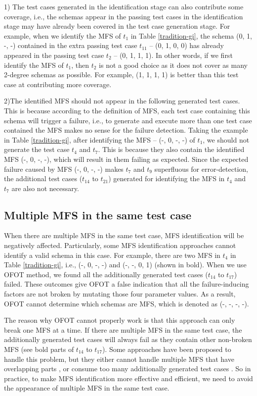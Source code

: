 \documentclass[journal,12pt,onecolumn,draftclsnofoot,]{IEEEtran}
\begin{document}
1) The test cases generated in the identification stage can also contribute some coverage, i.e., the schemas appear in the passing test cases in the identification stage may have already been covered in the test case generation stage. For example, when we identify the MFS of $t_{1}$ in Table \ref{tradition-gi}, the schema (0, 1, -, -) contained in the extra passing test case $t_{11}$ -- (0, 1, 0, 0) has already appeared in the passing test case $t_{2}$ -- (0, 1, 1, 1). In other words, if we first identify the MFS of $t_{1}$, then $t_{2}$ is not a good choice as it does not cover as many 2-degree schemas as possible. For example, (1, 1, 1, 1) is better than this test case at contributing more coverage.

2)The identified MFS should not appear in the following generated test cases.  This is because according to the definition of MFS, each test case containing this schema will trigger a failure, i.e., to generate and execute more than one test case contained the MFS makes no sense for the failure detection. Taking the example in Table \ref{tradition-gi}, after identifying the MFS -- (-, 0, -, -) of $t_{1}$, we should not generate the test case $t_{4}$ and $t_{7}$. This is because they also contain the identified MFS (-, 0, -, -), which will result in them failing as expected. Since the expected failure caused by MFS (-, 0, -, -) makes $t_{7}$ and $t_{9}$ superfluous for error-detection, the additional test cases ($t_{14}$ to $t_{21}$) generated for identifying the MFS in $t_{4}$ and $t_{7}$ are also not necessary.


\subsection{Multiple MFS in the same test case}\label{sec:moti:multi}
When there are multiple MFS in the same test case, MFS identification will be negatively affected. Particularly, some MFS identification approaches cannot identify a valid schema in this case. For example, there are two MFS in $t_{4}$ in Table \ref{tradition-gi}, i.e., (-, 0, -, -) and (-, -, 0, 1) (shown in bold). When we use OFOT method, we found all the additionally generated test cases ($t_{14}$ to $t_{17}$) failed. These outcomes give OFOT a false indication that all the failure-inducing factors are not broken by mutating those four parameter values.  As a result, OFOT cannot determine which schemas are MFS, which is denoted as (-, -, -, -).

The reason why OFOT cannot properly work is that this approach can only break one MFS at a time. If there are multiple MFS in the same test case, the additionally generated test cases will always fail as they contain other non-broken MFS (see bold parts of $t_{14}$ to $t_{17}$). Some approaches have been proposed to handle this problem, but they either cannot handle multiple MFS that have overlapping parts \cite{zhang2011characterizing}, or consume too many additionally generated test cases \cite{wang2010adaptive,niu2013identifying}. So in practice, to make MFS identification more effective and efficient, we need to avoid the appearance of multiple MFS in the same test case.
\end{document}
